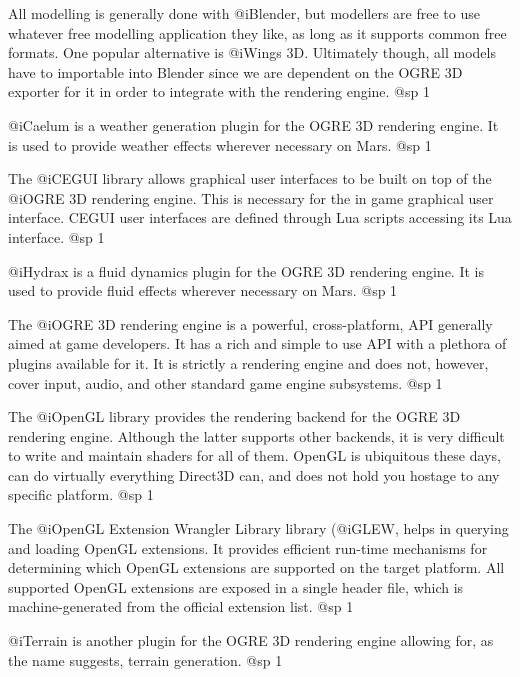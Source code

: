 \itemize
\item
All modelling is generally done with @i{Blender}, but modellers are free to use whatever free modelling application they like, as long as it supports common free formats. One popular alternative is @i{Wings 3D}. Ultimately though, all models have to importable into Blender since we are dependent on the OGRE 3D exporter for it in order to integrate with the rendering engine.
@sp 1

\item
@i{Caelum} is a weather generation plugin for the OGRE 3D rendering engine. It is used to provide weather effects wherever necessary on Mars.
@sp 1

\item
The @i{CEGUI} library allows graphical user interfaces to be built on top of the @i{OGRE 3D} rendering engine. This is necessary for the in game graphical user interface. CEGUI user interfaces are defined through Lua scripts accessing its Lua interface.
@sp 1

\item
@i{Hydrax} is a fluid dynamics plugin for the OGRE 3D rendering engine. It is used to provide fluid effects wherever necessary on Mars.
@sp 1

\item
The @i{OGRE 3D} rendering engine is a powerful, cross-platform, API generally aimed at game developers. It has a rich and simple to use API with a plethora of plugins available for it. It is strictly a rendering engine and does not, however, cover input, audio, and other standard game engine subsystems.
@sp 1

\item
The @i{OpenGL} library provides the rendering backend for the OGRE 3D rendering engine. Although the latter supports other backends, it is very difficult to write and maintain shaders for all of them. OpenGL is ubiquitous these days, can do virtually everything Direct3D can, and does not hold you hostage to any specific platform.
@sp 1

\item
The @i{OpenGL Extension Wrangler Library} library (@i{GLEW}, helps in querying and loading OpenGL extensions. It provides efficient run-time mechanisms for determining which OpenGL extensions are supported on the target platform. All supported OpenGL extensions are exposed in a single header file, which is machine-generated from the official extension list.
@sp 1

\item
@i{Terrain} is another plugin for the OGRE 3D rendering engine allowing for, as the name suggests, terrain generation.
@sp 1

